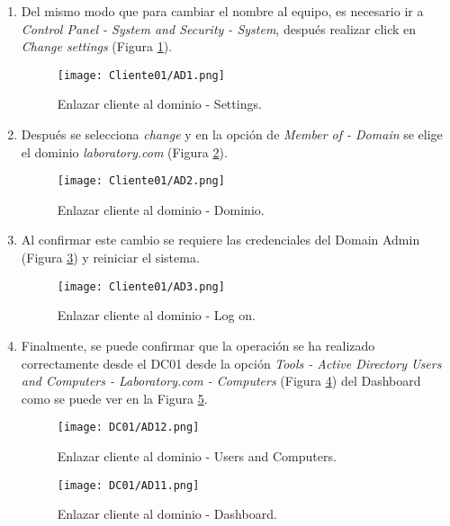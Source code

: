 \begin{enumerate}
\item Del mismo modo que para cambiar el nombre al equipo, es necesario ir a {\it Control Panel - System and Security - System}, después realizar click en {\it Change settings} (Figura \ref{Cliente01-AD1}). 
\begin{figure}[H] %
\begin{center}
\texttt{[image: Cliente01/AD1.png]}
\end{center}
\caption{Enlazar cliente al dominio - Settings.}
\label{Cliente01-AD1}
\end{figure}

\item Después se selecciona {\it change} y en la opción de {\it Member of - Domain} se elige el dominio {\it laboratory.com} (Figura \ref{Cliente01-AD2}).
\begin{figure}[H] %
\begin{center}
\texttt{[image: Cliente01/AD2.png]}
\end{center}
\caption{Enlazar cliente al dominio - Dominio.}
\label{Cliente01-AD2}
\end{figure}


\item Al confirmar este cambio se requiere las credenciales del Domain Admin (Figura \ref{Cliente01-AD3}) y reiniciar el sistema.
\begin{figure}[H] %
\begin{center}
\texttt{[image: Cliente01/AD3.png]}
\end{center}
\caption{Enlazar cliente al dominio - Log on.}
\label{Cliente01-AD3}
\end{figure}

\item Finalmente, se puede confirmar que la operación se ha realizado correctamente desde el DC01 desde la opción {\it Tools - Active Directory Users and Computers - Laboratory.com - Computers} (Figura \ref{DC01-AD12}) del Dashboard como se puede ver en la Figura \ref{DC01-AD11}. 
\begin{figure}[H] %
\begin{center}
\texttt{[image: DC01/AD12.png]}
\end{center}
\caption{Enlazar cliente al dominio - Users and Computers.}
\label{DC01-AD12}
\end{figure}

\begin{figure}[H] %
\begin{center}
\texttt{[image: DC01/AD11.png]}
\end{center}
\caption{Enlazar cliente al dominio - Dashboard.}
\label{DC01-AD11}
\end{figure}


\end{enumerate}

